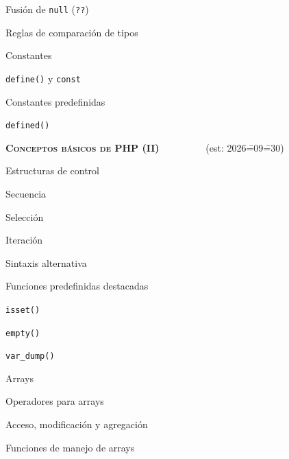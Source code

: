 \begin{longenum}
\begin{longenum}
\begin{longenum}
\begin{longenum}
                \item Fusión de \texttt{null} (\texttt{??})
                \item Reglas de comparación de tipos
            \end{longenum}
        \end{longenum}
        \item Constantes
        \begin{longenum}
            \item \texttt{define()} y \texttt{const}
            \item Constantes predefinidas
            \item \texttt{defined()}
        \end{longenum}
    \end{longenum}
    \item \textbf{\textsc{Conceptos básicos de PHP (II)}} \ \ \ \ \ \ \ \ \ (est: 2026\==09\==30)
    \begin{longenum}
        \item Estructuras de control
        \begin{longenum}
            \item Secuencia
            \item Selección
            \item Iteración
            \item Sintaxis alternativa
        \end{longenum}
        \item Funciones predefinidas destacadas
        \begin{longenum}
            \item \texttt{isset()}
            \item \texttt{empty()}
            \item \texttt{var\_dump()}
        \end{longenum}
        \item Arrays
        \begin{longenum}
            \item Operadores para arrays
            \begin{longenum}
                \item Acceso, modificación y agregación
            \end{longenum}
            \item Funciones de manejo de arrays
            \begin{longenum}

\end{longenum}
\end{longenum}
\end{longenum}
\end{longenum}
